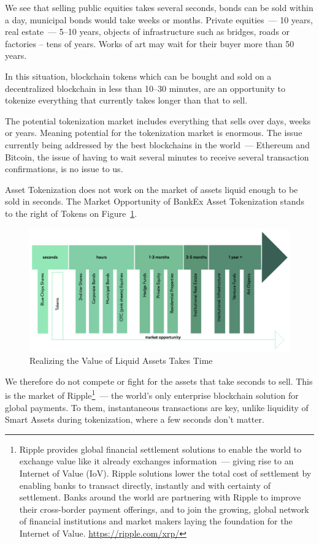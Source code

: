\documentclass{article}
\begin{document}
\begin{multicols}{2}
We see that selling public equities takes several seconds, bonds can be sold within a day, municipal bonds would take weeks or months. Private equities~--- 10 years, real estate~--- 5--10 years, objects of infrastructure such as bridges, roads or factories – tens of years. Works of art may wait for their buyer more than 50 years. 

In this situation, blockchain tokens which can be bought and sold on a decentralized blockchain in less than 10--30 minutes, are an opportunity to tokenize everything that currently takes longer than that to sell. 

The potential tokenization market includes everything that sells over days, weeks or years. Meaning potential for the tokenization market is enormous. The issue currently being addressed by the best blockchains in the world~--- Ethereum and Bitcoin, the issue of having to wait several minutes to receive several transaction confirmations, is no issue to us. 

Asset Tokenization does not work on the market of assets liquid enough to be sold in seconds. The Market Opportunity of BankEx Asset Tokenization stands to the right of Tokens on Figure~\ref{fig:liquidity-over-time}.

\begin{figure}
  \centering
  \includegraphics[width=\textwidth]{liquidity-over-time.png}
  \caption{Realizing the Value of Liquid Assets Takes Time}
  \label{fig:liquidity-over-time}
\end{figure}

We therefore do not compete or fight for the assets that take seconds to sell. This is the market of Ripple\footnote{Ripple provides global financial settlement solutions to enable the world to exchange value like it already exchanges information~--- giving rise to an Internet of Value (IoV). Ripple solutions lower the total cost of settlement by enabling banks to transact directly, instantly and with certainty of settlement. Banks around the world are partnering with Ripple to improve their cross-border payment offerings, and to join the growing, global network of financial institutions and market makers laying the foundation for the Internet of Value. \url{https://ripple.com/xrp/}}~--- the world’s only enterprise blockchain solution for global payments. To them, instantaneous transactions are key, unlike liquidity of Smart Assets during tokenization, where a few seconds don't matter.


\end{multicols}
\end{document}
